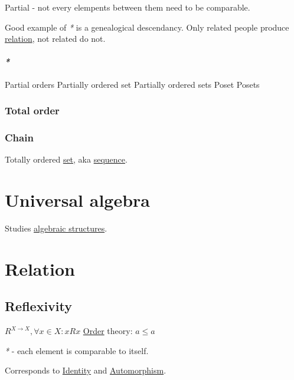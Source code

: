 \documentclass[a4paper,14pt,oneside]{book}
\begin{document}
Partial - not every elempents between them need to be comparable.

Good example of \emph{*} is a genealogical descendancy. Only related people produce \hyperref[org5b7e58d]{relation}, not related do not.

\subsubsection{\emph{*}}
\label{sec:org7f496a4}

\label{org1efeaff}Partial orders
\label{orgf91f3ef}Partially ordered set
\label{org8a36554}Partially ordered sets
\label{org2f37d6a}Poset
\label{org1774a16}Posets


\subsection{\label{org695c6cd}Total order}
\label{sec:org1c4517c}

\subsection{\label{org1c2ad95}Chain}
\label{sec:org7f8a796}

Totally ordered \hyperref[org6b6e43e]{set}, aka \hyperref[orgf891b8e]{sequence}.

\chapter{\label{orgc201e3d}Universal algebra}
\label{sec:org1055dc3}

Studies \hyperref[org889b78d]{algebraic structures}.

\chapter{\label{org4422d49}Relation}
\label{sec:org8ed0ee6}

\section{\label{orge3fdd41}Reflexivity}
\label{sec:org93a30eb}

\(R^{X \to X}, \forall x \in X : x R x\)
\hyperref[orgde40ac0]{Order} theory: \(a \le a\)

\emph{*} - each element is comparable to itself.

Corresponds to \hyperref[org0d91e37]{Identity} and \hyperref[org7b3a506]{Automorphism}.
\end{document}

